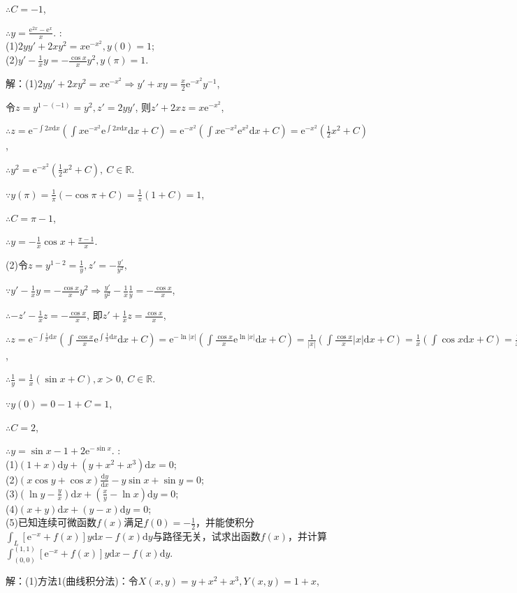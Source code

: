 \documentclass[12pt,UTF8]{ctexart}
\newcommand{\md}[1]{\mathrm d#1}
\newcommand{\me}[0]{\mathrm e}
\begin{document}
\begin{enumerate}
$\therefore C=-1$,

$\therefore y=\frac{\me^{2x}-\me^x}x$.
:\\
(1)$2yy'+2xy^2=x\me^{-x^2},y(0)=1$;\\
(2)$y'-\frac1xy=-\frac{\cos x}xy^2,y(\pi)=1$.

解：(1)$2yy'+2xy^2=x\me^{-x^2}\Rightarrow y'+xy=\frac x2\me^{-x^2}y^{-1}$,

令$z=y^{1-(-1)}=y^2,z'=2yy'$, 则$z'+2xz=x\me^{-x^2}$,

$\therefore z=\me^{-\int2x\md x}(\int x\me^{-x^2}\me^{\int2x\md x}\md x+C)=\me^{-x^2}(\int x\me^{-x^2}\me^{x^2}\md x+C)=\me^{-x^2}(\frac12x^2+C)$,

$\therefore y^2=\me^{-x^2}(\frac12x^2+C),\ C\in\mathbb R$.

$\because y(\pi)=\frac1\pi(-\cos\pi+C)=\frac1\pi(1+C)=1$,

$\therefore C=\pi-1$,

$\therefore y=-\frac1x\cos x+\frac{\pi-1}x$.

(2)令$z=y^{1-2}=\frac1y,z'=-\frac{y'}{y^2}$,

$\because y'-\frac1xy=-\frac{\cos x}xy^2\Rightarrow \frac{y'}{y^2}-\frac1x\frac1y=-\frac{\cos x}x$,

$\therefore -z'-\frac1xz=-\frac{\cos x}x$, 即$z'+\frac1xz=\frac{\cos  x}x$,

$\therefore z=\me^{-\int\frac1x\md x}(\int\frac{\cos x}x\me^{\int\frac1x\md x}\md x+C)=\me^{-\ln|x|}(\int\frac{\cos x}x\me^{\ln|x|}\md x+C)=\frac1{|x|}(\int\frac{\cos x}x|x|\md x+C)=\frac1x(\int\cos x\md x+C)=\frac1x(\sin x+C),x>0$,

$\therefore\frac1y=\frac1x(\sin x+C),x>0,\ C\in\mathbb R$.

$\because y(0)=0-1+C=1$,

$\therefore C=2$,

$\therefore y=\sin x-1+2\me^{-\sin x}$.
:\\
(1)$(1+x)\md y+(y+x^2+x^3)\md x=0$;\\
(2)$(x\cos y+\cos x)\frac{\md y}{\md x}-y\sin x+\sin y=0$;\\
(3)$(\ln y-\frac yx)\md x+(\frac xy-\ln x)\md y=0$;\\
(4)$(x+y)\md x+(y-x)\md y=0$;\\
(5)已知连续可微函数$f(x)$满足$f(0)=-\frac12$，并能使积分$\int_L[\me^{-x}+f(x)]y\md x-f(x)\md y$与路径无关，试求出函数$f(x)$，并计算$\int_{(0,0)}^{(1,1)}[\me^{-x}+f(x)]y\md x-f(x)\md y$.

解：(1)方法1(曲线积分法)：令$X(x,y)=y+x^2+x^3,Y(x,y)=1+x$,


\end{enumerate}
\end{document}
